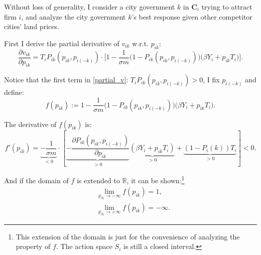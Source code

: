 Without loss of generality, I consider a city government $k$ in $\mathbf{C}_{i}$
trying to attract firm $i$,
and analyze the city government $k$'s best response given other competitor cities' land prices.

First I derive the partial derivative of $v_{ik}$ w.r.t. $p_{ik}$:
\begin{equation}
    \frac{\partial v_{ik}}{\partial p_{ik}} =
    T_i P_{ik}(p_{ik}, p_{i(-k)})
    \cdot
    \big[1 - \frac{1}{\sigma m}\big(1-P_{ik}(p_{ik}, p_{i(-k)})\big)
    \big(\beta Y_i + p_{ik}T_i \big)\big].
    \label{partial_v}
\end{equation}

Notice that the first term in \eqref{partial_v}: $T_i P_{ik}(p_{ik}, p_{i(-k)}) > 0$,
I fix $p_{i(-k)}$ and define:
\[
    f(p_{ik}) := 1 - \frac{1}{\sigma m} \big(1-P_{ik}(p_{ik}, p_{i(-k)})\big)
    \big(\beta Y_i + p_{ik}T_i \big).
\]

The derivative of $f(p_{ik})$ is:
\begin{equation}
    f'(p_{ik}) = \underbrace{-\frac{1}{\sigma m}}_{<0}
    \cdot[\underbrace{-\frac{\partial P_{ik}(p_{ik}, p_{i(-k)})}{\partial p_{i k}}}_{>0}
    \underbrace{\left(\beta Y_{i}+p_{i k} T_{i}\right)}_{>0}
    +\underbrace{\left(1-P_{i}(k)\right) T_{i}}_{>0}]<0.
    \label{f'}
\end{equation}

And if the domain of $f$ is extended to $\mathbb{R}$, it can be shown:\footnote{
    This extension of the domain is just for the convenience of analyzing the property of $f$.
    The action space $S_i$ is still a closed interval.
}
\begin{equation}
    \begin{aligned}
         & \lim_{p_{ik} \to -\infty}f(p_{ik}) = 1,        \\
         & \lim_{p_{ik} \to +\infty }f(p_{ik}) = -\infty.
    \end{aligned}
    \label{f_limits}
\end{equation}

